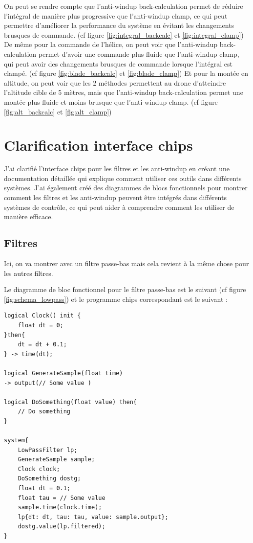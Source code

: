 \documentclass{article}
\begin{document}
On peut se rendre compte que l'anti-windup back-calculation permet de réduire l'intégral de manière plus progressive que l'anti-windup clamp, ce qui peut permettre d'améliorer la performance du système en évitant les changements brusques de commande. (cf figure \ref{fig:integral_backcalc} et \ref{fig:integral_clamp})
De même pour la commande de l'hélice, on peut voir que l'anti-windup back-calculation permet d'avoir une commande plus fluide que l'anti-windup clamp, qui peut avoir des changements brusques de commande lorsque l'intégral est clampé. (cf figure \ref{fig:blade_backcalc} et \ref{fig:blade_clamp})
Et pour la montée en altitude, on peut voir que les 2 méthodes permettent au drone d'atteindre l'altitude cible de 5 mètres, mais que l'anti-windup back-calculation permet une montée plus fluide et moins brusque que l'anti-windup clamp. (cf figure \ref{fig:alt_backcalc} et \ref{fig:alt_clamp})

\section{Clarification interface chips}

J'ai clarifié l'interface chips pour les filtres et les anti-windup en créant une documentation détaillée qui explique comment utiliser ces outils dans différents systèmes.
J'ai également créé des diagrammes de blocs fonctionnels pour montrer comment les filtres et les anti-windup peuvent être intégrés dans différents systèmes de contrôle, ce qui peut aider à comprendre comment les utiliser de manière efficace.

\subsection{Filtres}

Ici, on va montrer avec un filtre passe-bas mais cela revient à la même chose pour les autres filtres.

Le diagramme de bloc fonctionnel pour le filtre passe-bas est le suivant (cf figure \ref{fig:schema_lowpass}) et le
programme chips correspondant est le suivant :
\begin{verbatim}
logical Clock() init {
	float dt = 0;
}then{
	dt = dt + 0.1;
} -> time(dt);

logical GenerateSample(float time) 
-> output(// Some value )

logical DoSomething(float value) then{
	// Do something
}

system{
	LowPassFilter lp;
	GenerateSample sample;
	Clock clock;
	DoSomething dostg;
	float dt = 0.1;
	float tau = // Some value
	sample.time(clock.time);
    lp{dt: dt, tau: tau, value: sample.output};
	dostg.value(lp.filtered);
}
\end{verbatim}
\end{document}

